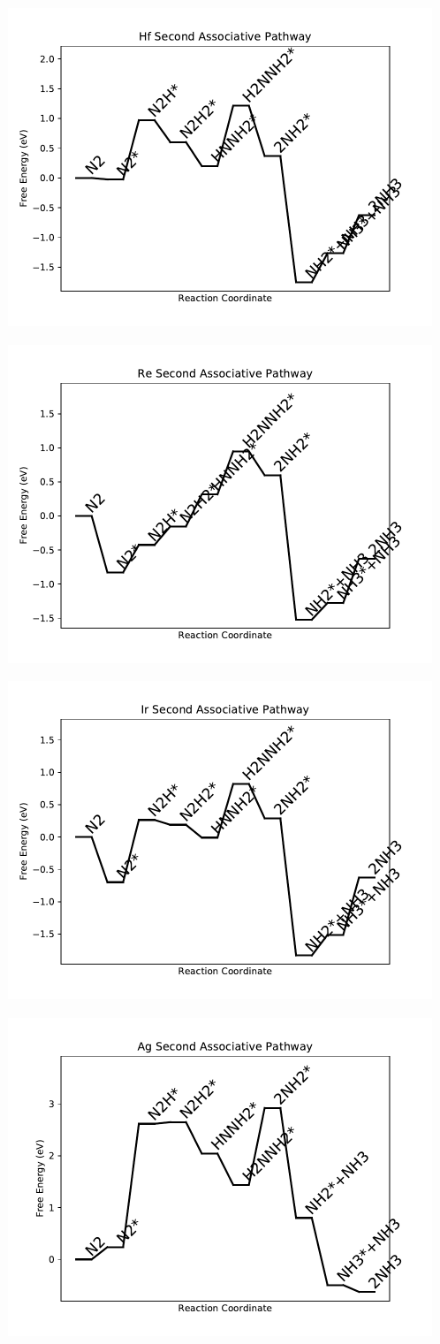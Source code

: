 \documentclass[journal=jacsat,manuscript=article]{achemso}
\begin{document}
\begin{figure}
\includegraphics[width=0.5\linewidth]{data/plots/Hf_associative_2.pdf}
\label{fig:Hf_associative_2}
\end{figure}

\newpage
\begin{figure}
\includegraphics[width=0.5\linewidth]{data/plots/Re_associative_2.pdf}
\label{fig:Re_associative_2}
\end{figure}

\begin{figure}
\includegraphics[width=0.5\linewidth]{data/plots/Ir_associative_2.pdf}
\label{fig:Ir_associative_2}
\end{figure}

\newpage
\begin{figure}
\includegraphics[width=0.5\linewidth]{data/plots/Ag_associative_2.pdf}
\label{fig:Ag_associative_2}
\end{figure}
\end{document}
